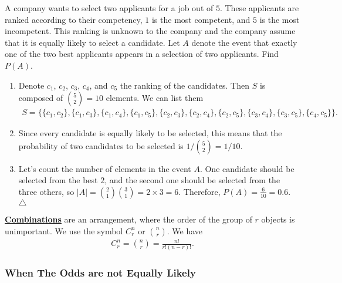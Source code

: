 \vspace*{16pt}

\begin{example}
A company wants to select two applicants for a job out of $5$. These applicants are ranked according to their competency, $1$ is the most competent, and $5$ is the most incompetent. This ranking is unknown to the company and the company assume that it is equally likely to select a candidate. Let $A$ denote the event that exactly one of the two best applicants appears in a selection of two applicants. Find $P(A)$.
\end{example}

\begin{sol*}
\begin{enumerate}[label=\Circled{\arabic*}]
\item Denote $c_1$, $c_2$, $c_3$, $c_4$, and $c_5$ the ranking of the candidates. Then $S$ is composed of $\binom{5}{2} = 10$ elements. We can list them
	\begin{align*}
	S = \{ \{ c_1 , c_2 \} , \{ c_1 , c_3 \} , \{ c_1 , c_4 \} , \{ c_1 , c_5 \} , \{ c_2 , c_3 \} , \{ c_2 , c_4 \} , \{ c_2 , c_5 \} , \{ c_3 , c_4 \} , \{ c_3 , c_5 \} , \{ c_4 , c_5 \} \} .
	\end{align*}
\item Since every candidate is equally likely to be selected, this means that the probability of two candidates to be selected is $1/ \binom{5}{2} = 1/10$.
\item Let's count the number of elements in the event $A$. One candidate should be selected from the best $2$, and the second one should be selected from the three others, so $|A| = \binom{2}{1} \binom{3}{1} = 2 \times 3 = 6$. Therefore, $P (A) = \frac{6}{10} = 0.6$. \hfill $\triangle$
\end{enumerate}
\end{sol*}

\underline{\textbf{Combinations}} are an arrangement, where the order of the group of $r$ objects is unimportant. We use the symbol $C_r^n$ or $\binom{n}{r}$. We have
	\begin{align*}
	C_r^n = \binom{n}{r} = \frac{n!}{r! (n - r)!} .
	\end{align*}



\subsubsection{When The Odds are not Equally Likely}

